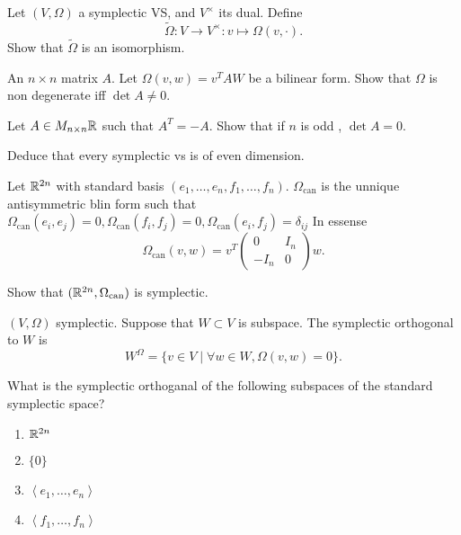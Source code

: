 \begin{exercise}
	Let $(V,\Omega)$ a symplectic VS, and $V^\times $ its dual. Define \[
		\tilde \Omega: V \to V^\times : v\mapsto \Omega(v, \cdot)
	.\]
	Show that $\tilde \Omega$ is an isomorphism.	
\end{exercise}
\begin{exercise}
	An $n \times n$ matrix $A$. Let  $\Omega(v,w) = v^T A W$ be a bilinear form.
	Show that $\Omega$ is non degenerate iff $\det A \ne 0$.
\end{exercise}
\begin{exercise}
	Let $A \in M_{n \times n} \mathbb{R}$ such that $A^T =- A$.
	Show that if  $n$ is odd , $\det A = 0$. 
\end{exercise}
\begin{exercise}
	Deduce that every symplectic vs is of even dimension.
\end{exercise}
\begin{example}
	Let $\mathbb{R}^{2n}$ with standard basis $(e_1, \ldots, e_n, f_1, \ldots, f_n)$. 
	$\Omega_\text{can} $ is the unnique antisymmetric blin form such that $\Omega_\text{can} (e_i, e_j) = 0, \Omega_\text{can} (f_i, f_j) = 0, \Omega_\text{can} (e_i, f_j) = \delta_{ij}$
	In essense
	\[
		\Omega_\text{can} (v,w) = v^T \begin{pmatrix} 0& I_n \\ -I_n & 0 \end{pmatrix} w
	.\] 
\end{example}
\begin{exercise}
	Show that $(\mathbb{R}^{2n}, \Omega_\text{can} )$ is symplectic.	
\end{exercise}
\begin{definition}
	$(V, \Omega)$ symplectic. Suppose that $W \subset V$ is subspace.
	The symplectic orthogonal to $W$ is \begin{equation}
		W^{\Omega} = \{v \in V \;|\; \forall w \in W, \Omega(v, w) = 0\} 
	.\end{equation} 
\end{definition}
\begin{exercise}
What is the symplectic orthoganal of the following subspaces of the standard symplectic space?	
\begin{enumerate}
	\item $\mathbb{R}^{2n}$
	\item $\{0\} $
	\item $\left<e_1, \ldots, e_n\right>$
	\item $\left<f_1, \ldots, f_n\right>$
\end{enumerate}
\end{exercise}
